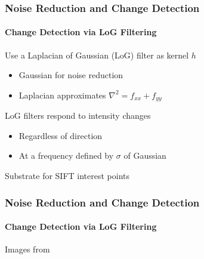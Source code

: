 \documentclass[xetex,professionalfont]{beamer}
\begin{document}

\begin{frame}
\frametitle{Noise Reduction and Change Detection}
\framesubtitle{Change Detection via LoG Filtering}

Use a Laplacian of Gaussian (LoG) filter as kernel $h$ %
\begin{itemize}
	\item Gaussian for noise reduction
	\item Laplacian approximates $\nabla^2=f_{xx}+f_{yy}$ %
\end{itemize}

\bigskip
LoG filters respond to intensity changes %
\begin{itemize}
	\item Regardless of direction
	\item At a frequency defined by $\sigma$ of Gaussian
\end{itemize}

\bigskip
Substrate for SIFT interest points %

\end{frame}


\begin{frame}
\frametitle{Noise Reduction and Change Detection}
\framesubtitle{Change Detection via LoG Filtering}

\begin{center}
	{\centering Images from \cite{prince12}}
\end{center}

\end{frame}

\end{document}
